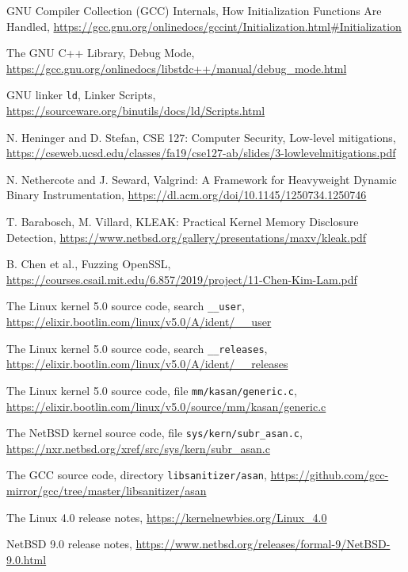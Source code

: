\documentclass[shortabstract, manyadvisors, english, mgr]{iithesis}
\theoremstyle{definition} \newtheorem*{definition}{Definicja}
\theoremstyle{definition} \newtheorem*{example}{Przykład}
\theoremstyle{definition} \newtheorem*{remark}{Uwaga}
\begin{document}
\begin{thebibliography}{99}
GNU Compiler Collection (GCC) Internals, How Initialization Functions Are Handled,
\url{https://gcc.gnu.org/onlinedocs/gccint/Initialization.html#Initialization}

The GNU C++ Library, Debug Mode,
\url{https://gcc.gnu.org/onlinedocs/libstdc++/manual/debug_mode.html}

GNU linker \texttt{ld}, Linker Scripts,
\url{https://sourceware.org/binutils/docs/ld/Scripts.html}

N. Heninger and D. Stefan,
CSE 127: Computer Security, Low-level mitigations,
\url{https://cseweb.ucsd.edu/classes/fa19/cse127-ab/slides/3-lowlevelmitigations.pdf}

N. Nethercote and J. Seward,
Valgrind: A Framework for Heavyweight Dynamic Binary Instrumentation,
\url{https://dl.acm.org/doi/10.1145/1250734.1250746}

T. Barabosch, M. Villard, KLEAK: Practical Kernel Memory Disclosure Detection,
\url{https://www.netbsd.org/gallery/presentations/maxv/kleak.pdf}

B. Chen et al.,
Fuzzing OpenSSL,
\url{https://courses.csail.mit.edu/6.857/2019/project/11-Chen-Kim-Lam.pdf}

The Linux kernel 5.0 source code, search \texttt{\_\_user},
\url{https://elixir.bootlin.com/linux/v5.0/A/ident/__user}

The Linux kernel 5.0 source code, search \texttt{\_\_releases},
\url{https://elixir.bootlin.com/linux/v5.0/A/ident/__releases}

The Linux kernel 5.0 source code, file \texttt{mm/kasan/generic.c},
\url{https://elixir.bootlin.com/linux/v5.0/source/mm/kasan/generic.c}

The NetBSD kernel source code, file \texttt{sys/kern/subr\_asan.c},
\url{https://nxr.netbsd.org/xref/src/sys/kern/subr_asan.c}

The GCC source code, directory \texttt{libsanitizer/asan},
\url{https://github.com/gcc-mirror/gcc/tree/master/libsanitizer/asan}

The Linux 4.0 release notes,
\url{https://kernelnewbies.org/Linux_4.0}

NetBSD 9.0 release notes,
\url{https://www.netbsd.org/releases/formal-9/NetBSD-9.0.html}


\end{thebibliography}
\end{document}
